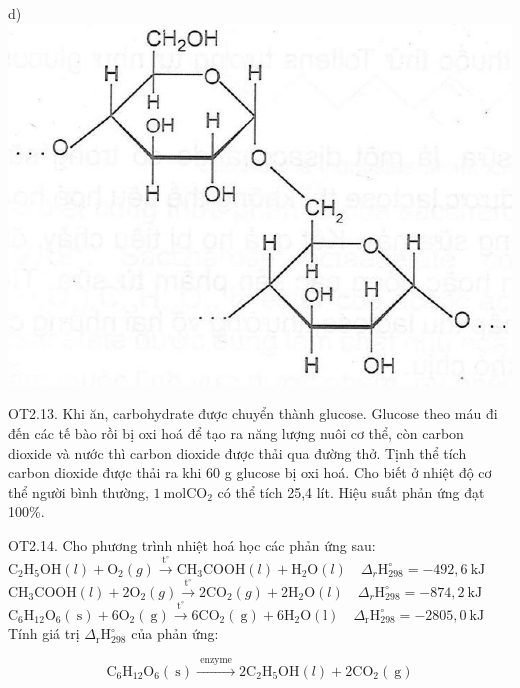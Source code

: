 \documentclass[10pt]{article}
\begin{document}
d)\\
\includegraphics[max width=\textwidth, center]{2025_10_23_de6f5713836e4e91b3c8g-039(1)}

OT2.13. Khi ăn, carbohydrate được chuyển thành glucose. Glucose theo máu đi đến các tế bào rồi bị oxi hoá để tạo ra năng lượng nuôi cơ thể, còn carbon dioxide và nước thì carbon dioxide được thải qua đường thở. Tịnh thể tích carbon dioxide được thải ra khi 60 g glucose bị oxi hoá. Cho biết ở nhiệt độ cơ thể người bình thường, $1 \mathrm{~mol} \mathrm{CO}_{2}$ có thể tích 25,4 lít. Hiệu suất phản ứng đạt 100\%.

OT2.14. Cho phương trình nhiệt hoá học các phản ứng sau:\\
$\mathrm{C}_{2} \mathrm{H}_{5} \mathrm{OH}(l)+\mathrm{O}_{2}(g) \xrightarrow{\mathrm{t}^{\circ}} \mathrm{CH}_{3} \mathrm{COOH}(l)+\mathrm{H}_{2} \mathrm{O}(l) \quad \Delta_{r} \mathrm{H}_{298}^{\circ}=-492,6 \mathrm{~kJ}$\\
$\mathrm{CH}_{3} \mathrm{COOH}(l)+2 \mathrm{O}_{2}(g) \xrightarrow{\mathrm{t}^{\circ}} 2 \mathrm{CO}_{2}(g)+2 \mathrm{H}_{2} \mathrm{O}(l) \quad \Delta_{r} \mathrm{H}_{298}^{\circ}=-874,2 \mathrm{~kJ}$\\
$\mathrm{C}_{6} \mathrm{H}_{12} \mathrm{O}_{6}(\mathrm{~s})+6 \mathrm{O}_{2}(\mathrm{~g}) \xrightarrow{\mathrm{t}^{\circ}} 6 \mathrm{CO}_{2}(\mathrm{~g})+6 \mathrm{H}_{2} \mathrm{O}(\mathrm{l}) \quad \Delta_{\mathrm{r}} \mathrm{H}_{298}^{\circ}=-2805,0 \mathrm{~kJ}$\\
Tính giá trị $\Delta_{\mathrm{r}} \mathrm{H}_{298}^{\circ}$ của phản ứng:

$$
\mathrm{C}_{6} \mathrm{H}_{12} \mathrm{O}_{6}(\mathrm{~s}) \xrightarrow{\text { enzyme }} 2 \mathrm{C}_{2} \mathrm{H}_{5} \mathrm{OH}(l)+2 \mathrm{CO}_{2}(\mathrm{~g})
$$
\end{document}
